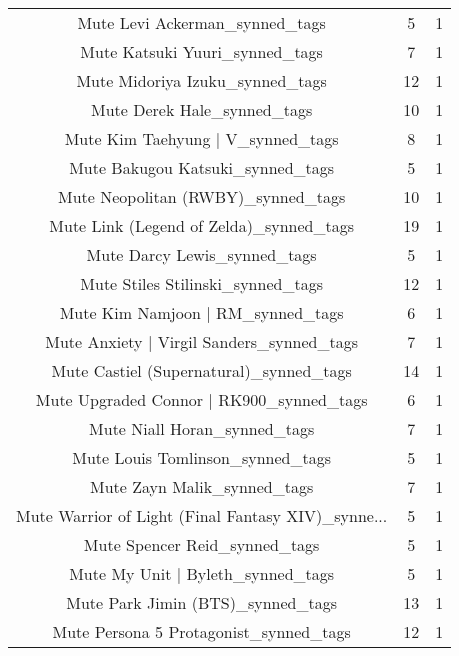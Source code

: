 \begin{table}[h!]
{\begin{tabular}{|c|c|c|}
                    Mute Levi Ackerman\_synned\_tags &           5 &          1 \\
                    Mute Katsuki Yuuri\_synned\_tags &           7 &          1 \\
                   Mute Midoriya Izuku\_synned\_tags &          12 &          1 \\
                       Mute Derek Hale\_synned\_tags &          10 &          1 \\
                 Mute Kim Taehyung | V\_synned\_tags &           8 &          1 \\
                  Mute Bakugou Katsuki\_synned\_tags &           5 &          1 \\
                Mute Neopolitan (RWBY)\_synned\_tags &          10 &          1 \\
           Mute Link (Legend of Zelda)\_synned\_tags &          19 &          1 \\
                      Mute Darcy Lewis\_synned\_tags &           5 &          1 \\
                 Mute Stiles Stilinski\_synned\_tags &          12 &          1 \\
                 Mute Kim Namjoon | RM\_synned\_tags &           6 &          1 \\
         Mute Anxiety | Virgil Sanders\_synned\_tags &           7 &          1 \\
           Mute Castiel (Supernatural)\_synned\_tags &          14 &          1 \\
          Mute Upgraded Connor | RK900\_synned\_tags &           6 &          1 \\
                      Mute Niall Horan\_synned\_tags &           7 &          1 \\
                  Mute Louis Tomlinson\_synned\_tags &           5 &          1 \\
                       Mute Zayn Malik\_synned\_tags &           7 &          1 \\
Mute Warrior of Light (Final Fantasy XIV)\_synne... &           5 &          1 \\
                     Mute Spencer Reid\_synned\_tags &           5 &          1 \\
                 Mute My Unit | Byleth\_synned\_tags &           5 &          1 \\
                 Mute Park Jimin (BTS)\_synned\_tags &          13 &          1 \\
            Mute Persona 5 Protagonist\_synned\_tags &          12 &          1 \\

\end{tabular}}
\end{table}
